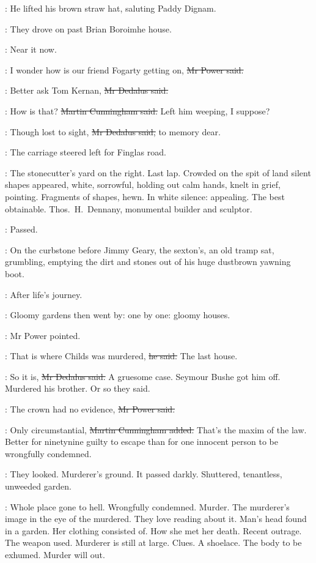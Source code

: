 :
He lifted his brown straw hat,
saluting Paddy Dignam.

:
They drove on past Brian Boroimhe house.

\BloomInt:
Near it now.

\power:
I wonder how is our friend Fogarty getting on,
\sout{Mr Power said.}

\simon:
Better ask Tom Kernan,
\sout{Mr Dedalus said.}

\cunningham:
How is that?
\sout{Martin Cunningham said.}
Left him weeping, I suppose?

\simon:
Though lost to sight,
\sout{Mr Dedalus said,}
to memory dear.

:
The carriage steered left for Finglas road.

\BloomInt:
The stonecutter's yard on the right.
Last lap.
Crowded on the spit of land
silent shapes appeared,
white, sorrowful, holding out calm hands,
knelt in grief, pointing.
Fragments of shapes, hewn.
In white silence:
appealing.
The best obtainable.
Thos.~H.~Dennany, monumental builder and sculptor.

\BloomInt:
Passed.

:
On the curbstone before Jimmy Geary, the sexton's,
an old tramp sat, grumbling,
emptying the dirt and stones out of his huge dustbrown yawning boot.

\BloomInt:
After life's journey.

:
Gloomy gardens then went by:
one by one:
gloomy houses.

:
Mr Power pointed.

\power:
That is where Childs was murdered,
\sout{he said.}
The last house.

\simon:
So it is,
\sout{Mr Dedalus said.}
A gruesome case.
Seymour Bushe got him off.
Murdered his brother.
Or so they said.

\power:
The crown had no evidence,
\sout{Mr Power said.}

\cunningham:
Only circumstantial,
\sout{Martin Cunningham added.}
That's the maxim of the law.
Better for ninetynine guilty to escape
than for one innocent person to be wrongfully condemned.

:
They looked.
Murderer's ground.
It passed darkly.
Shuttered, tenantless, unweeded garden.

\BloomInt:
Whole place gone to hell.
Wrongfully condemned.
Murder.
The murderer's image in the eye of the murdered.
They love reading about it.
Man's head found in a garden.
Her clothing consisted of.
How she met her death.
Recent outrage.
The weapon used.
Murderer is still at large.
Clues.
A shoelace.
The body to be exhumed.
Murder will out.

